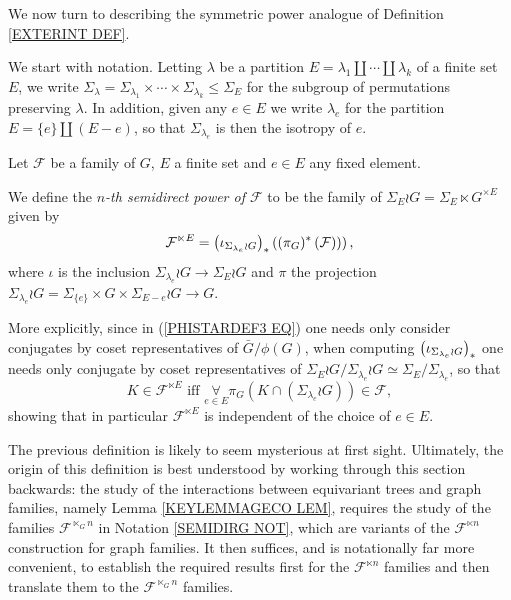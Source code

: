 \documentclass[a4paper,10pt]{article}%
\begin{document}
We now turn to describing the symmetric power analogue of 
Definition \ref{EXTERINT DEF}.

We start with notation. Letting 
$\lambda$ be a partition 
$E = \lambda_1 \amalg\cdots \amalg \lambda_k$
of a finite set $E$, 
we write 
 $\Sigma_{\lambda} = \Sigma_{\lambda_1} \times \cdots \times
 \Sigma_{\lambda_k} \leq \Sigma_E$ for the subgroup of permutations preserving $\lambda$. 
 In addition, given any $e \in E$ we write
$\lambda_e$ for the partition $E = \{e\} \amalg (E-e)$, so that $\Sigma_{\lambda_e}$ is then the isotropy of $e$.


\begin{definition}\label{FLTIMESN DEF}
 Let $\mathcal{F}$ be a family of $G$,
 $E$ a finite set and $e \in E$ any fixed element.
 
We define the \textit{$n$-th semidirect power of $\mathcal{F}$} to be the family of $\Sigma_E \wr G = \Sigma_E \ltimes G^{\times E}$ given by
\[
	\mathcal{F}^{\ltimes E}
		=
	\left(
	\iota_{\Sigma_{\lambda_e} \wr G}
	\right)_{\**}
	\left(
		\left(
		\pi_{G})^{\**}\left(\mathcal{F}\right)
		\right)
	\right),
\]
where $\iota$ is the inclusion 
$\Sigma_{\lambda_e} \wr G
	\to 
\Sigma_E \wr G$
and $\pi$ the projection
$\Sigma_{\lambda_e} \wr G = \Sigma_{\{e\}} \times G \times \Sigma_{E-e} \wr G
\to G$.

More explicitly, since in (\ref{PHISTARDEF3 EQ}) one needs only consider conjugates by coset representatives of $\bar{G}/\phi(G)$, when computing 
$\left( \iota_{\Sigma_{\lambda_e} \wr G}\right)_{\**}$
one needs only conjugate by coset representatives of 
$\Sigma_E \wr G/\Sigma_{\lambda_e} \wr G \simeq \Sigma_E/\Sigma_{\lambda_e}$, so that
\begin{equation}\label{FLTIMESN2 EQ}
	K \in \mathcal{F}^{\ltimes E} 
	\text{ iff }
	\underset{e \in E}{\forall} \pi_{G}
	\left(
		K \cap \left( \Sigma_{\lambda_e} \wr G \right)
	\right)
	\in \mathcal{F},
\end{equation}
showing that in particular $\mathcal{F}^{\ltimes E}$
is independent of the choice of $e \in E$.
\end{definition}


\begin{remark}
The previous definition is likely to seem mysterious at first sight. Ultimately, the origin of this definition
is best understood by working through this section backwards:
the study of the interactions between equivariant trees and graph families, namely Lemma \ref{KEYLEMMAGECO LEM}, requires the study of the families $\mathcal{F}^{\ltimes_G n}$ in Notation \ref{SEMIDIRG NOT}, which are variants of the $\mathcal{F}^{\ltimes n}$ construction for graph families.
It then suffices, and is notationally far more convenient, to establish the required results first for the $\mathcal{F}^{\ltimes n}$ families and then translate them to the $\mathcal{F}^{\ltimes_G n}$ families.
\end{remark}
\end{document}
